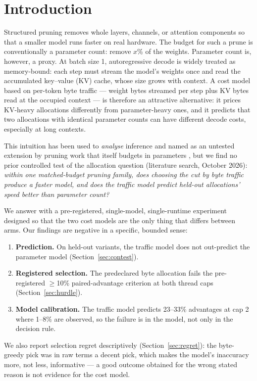 \documentclass[11pt]{article}
\begin{document}
\section{Introduction}
Structured pruning removes whole layers, channels, or attention
components so that a smaller model runs faster on real hardware.
The budget for such a prune is conventionally a parameter count:
remove $x$\% of the weights. Parameter count is, however, a proxy.
At batch size 1, autoregressive decode is widely treated as
memory-bound: each step must stream the model's weights once and
read the accumulated key--value (KV) cache, whose size grows with
context. A cost model based on per-token byte traffic --- weight
bytes streamed per step plus KV bytes read at the occupied context
--- is therefore an attractive alternative: it prices KV-heavy
allocations differently from parameter-heavy ones, and it predicts
that two allocations with identical parameter counts can have
different decode costs, especially at long contexts.

This intuition has been used to \emph{analyse} inference
\citep{rooflinebench2026} and named as an untested extension by
pruning work that itself budgets in parameters
\citep{grasprune2026}, but we find no prior controlled test of the
allocation question (literature search, October 2026):
\emph{within one matched-budget pruning
family, does choosing the cut by byte traffic produce a faster
model, and does the traffic model predict held-out allocations'
speed better than parameter count?}

We answer with a pre-registered, single-model, single-runtime
experiment designed so that the two cost models are the only thing
that differs between arms. Our findings are negative in a specific,
bounded sense:
\begin{enumerate}
\item \textbf{Prediction.} On held-out variants, the traffic model
does not out-predict the parameter model (Section~\ref{sec:contest}).
\item \textbf{Registered selection.} The predeclared byte
allocation fails the pre-registered $\geq$10\% paired-advantage
criterion at both thread caps (Section~\ref{sec:hurdle}).
\item \textbf{Model calibration.} The traffic model predicts
23--33\% advantages at cap 2 where 1--8\% are observed, so the
failure is in the model, not only in the decision rule.
\end{enumerate}
We also report selection regret descriptively
(Section~\ref{sec:regret}): the byte-greedy pick was in raw terms a
decent pick, which makes the model's inaccuracy more, not less,
informative --- a good outcome obtained for the wrong stated reason
is not evidence for the cost model.
\end{document}
